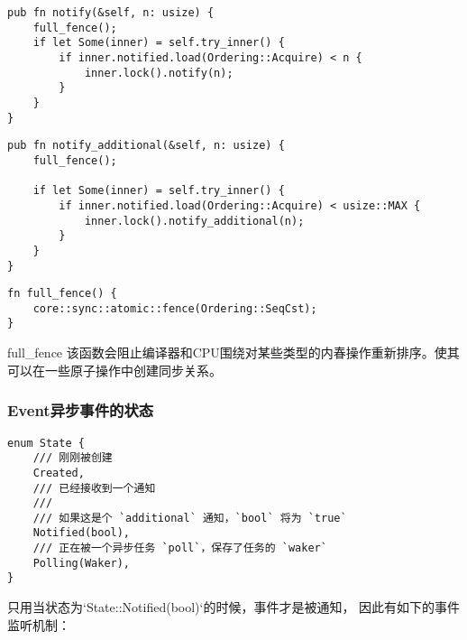 \begin{lstlisting}[caption = 通知一定数量的监听者]
pub fn notify(&self, n: usize) {
    full_fence();
    if let Some(inner) = self.try_inner() {
        if inner.notified.load(Ordering::Acquire) < n {
            inner.lock().notify(n);
        }
    }
}
\end{lstlisting}

\begin{lstlisting}[caption = 通知一定数量没有被通知的监听者]
pub fn notify_additional(&self, n: usize) {
    full_fence();

    if let Some(inner) = self.try_inner() {
        if inner.notified.load(Ordering::Acquire) < usize::MAX {
            inner.lock().notify_additional(n);
        }
    }
}
\end{lstlisting}

\begin{lstlisting}[caption=full\_fence]
fn full_fence() {
    core::sync::atomic::fence(Ordering::SeqCst);
}
\end{lstlisting}

full\_fence 该函数会阻止编译器和CPU围绕对某些类型的内春操作重新排序。使其可以在一些原子操作中创建同步关系。

\subsubsection{Event异步事件的状态}
\begin{lstlisting}[caption=Event的状态]
enum State {
    /// 刚刚被创建
    Created,
    /// 已经接收到一个通知
    ///
    /// 如果这是个 `additional` 通知，`bool` 将为 `true`
    Notified(bool),
    /// 正在被一个异步任务 `poll`，保存了任务的 `waker`
    Polling(Waker),
}
\end{lstlisting}

只用当状态为`State::Notified(bool)`的时候，事件才是被通知， 因此有如下的事件监听机制：

